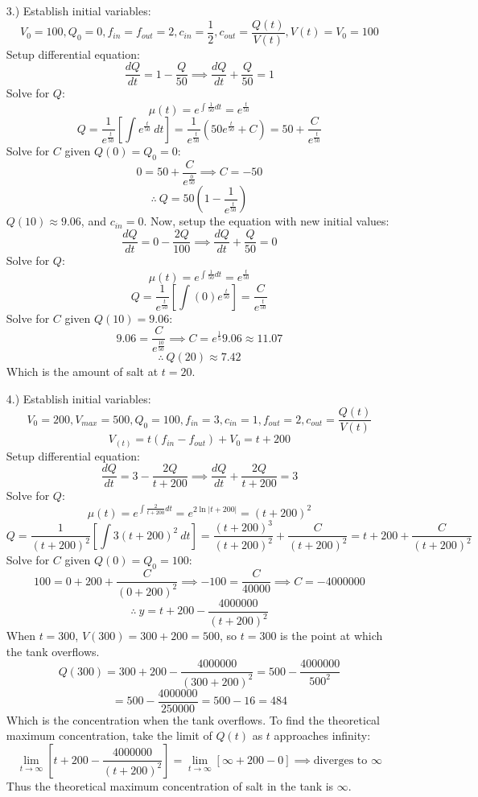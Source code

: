 \documentclass[12pt]{article}
\newcommand{\bracks}[1]{\left[#1\right]}
\begin{document}
\begin{itemize}
    \pagebreak
    \item [3.)] Establish initial variables:
    \[V_0=100,Q_0=0,f_{in}=f_{out}=2,c_{in}=\frac{1}{2},c_{out}=\frac{Q(t)}{V(t)},V(t)=V_0=100\]
    Setup differential equation:
    \[\frac{dQ}{dt}=1-\frac{Q}{50}\implies\frac{dQ}{dt}+\frac{Q}{50}=1\]
    Solve for $Q$:
    \[\mu(t)=e^{\int\frac{1}{50}dt}=e^\frac{t}{50}\]
    \[Q=\frac{1}{e^\frac{t}{50}}\bracks{\int e^\frac{t}{50}\ dt}=\frac{1}{e^\frac{t}{50}}\left(50e^\frac{t}{50}+C\right)=50+\frac{C}{e^\frac{t}{50}}\]
    Solve for $C$ given $Q(0)=Q_0=0$:
    \[0=50+\frac{C}{e^\frac{0}{50}}\implies C=-50\]
    \[\therefore\ Q=50\left(1-\frac{1}{e^\frac{t}{50}}\right)\]
    $Q(10)\approx9.06$, and $c_{in}=0$. Now, setup the equation with new initial values:
    \[\frac{dQ}{dt}=0-\frac{2Q}{100}\implies\frac{dQ}{dt}+\frac{Q}{50}=0\]
    Solve for $Q$:
    \[\mu(t)=e^{\int\frac{1}{50}dt}=e^{\frac{t}{50}}\]
    \[Q=\frac{1}{e^{\frac{t}{50}}}\bracks{\int(0)e^{\frac{t}{50}}}=\frac{C}{e^\frac{t}{50}}\]
    Solve for $C$ given $Q(10)=9.06$:
    \[9.06=\frac{C}{e^\frac{10}{50}}\implies C=e^\frac{1}{5}9.06\approx11.07\]
    \[\therefore\ Q(20)\approx7.42\]
    Which is the amount of salt at $t=20$.

    \pagebreak
    \item [4.)] Establish initial variables:
    \[V_0=200,V_{max}=500,Q_0=100,f_{in}=3,c_{in}=1,f_{out}=2,c_{out}=\frac{Q(t)}{V(t)}\]
    \[V_(t)=t(f_{in}-f_{out})+V_0=t+200\]
    Setup differential equation:
    \[\frac{dQ}{dt}=3-\frac{2Q}{t+200}\implies\frac{dQ}{dt}+\frac{2Q}{t+200}=3\]
    Solve for $Q$:
    \[\mu(t)=e^{\int\frac{2}{t+200}dt}=e^{2\ln\vert t+200\vert}=(t+200)^2\]
    \[Q=\frac{1}{(t+200)^2}\bracks{\int3(t+200)^2\ dt}=\frac{(t+200)^3}{(t+200)^2}+\frac{C}{(t+200)^2}=t+200+\frac{C}{(t+200)^2}\]
    Solve for $C$ given $Q(0)=Q_0=100$:
    \[100=0+200+\frac{C}{(0+200)^2}\implies-100=\frac{C}{40000}\implies C=-4000000\]
    \[\therefore\ y=t+200-\frac{4000000}{(t+200)^2}\]
    When $t=300$, $V(300)=300+200=500$, so $t=300$ is the point at which the tank overflows.
    \[Q(300)=300+200-\frac{4000000}{(300+200)^2}=500-\frac{4000000}{500^2}\]
    \[=500-\frac{4000000}{250000}=500-16=484\]
    Which is the concentration when the tank overflows. To find the theoretical maximum concentration, take the limit of $Q(t)$ as $t$ approaches infinity:
    \[\lim_{t\to\infty}\bracks{t+200-\frac{4000000}{(t+200)^2}}=\lim_{t\to\infty}\bracks{\infty+200-0}\implies\text{diverges to }\infty\]
    Thus the theoretical maximum concentration of salt in the tank is $\infty$.
\end{itemize}
\end{document}
